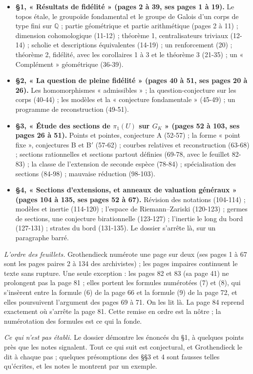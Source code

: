 \documentclass[11pt,a4paper]{article}
\begin{document}
\begin{itemize}
\item \textbf{§1, « Résultats de fidélité » (pages 2 à 39, ses pages 1 à 19).}
Le topos étale, le groupoïde fondamental et le groupe de Galois d'un corps de
type fini sur $\mathbb{Q}$ ; partie géométrique et partie arithmétique
(pages 2 à 11) ; dimension cohomologique (11-12) ; théorème 1, centralisateurs
triviaux (12-14) ; scholie et descriptions équivalentes (14-19) ; un
renforcement (20) ; théorème 2, fidélité, avec les corollaires 1 à 3 et le
théorème 3 (21-35) ; un « Complément » géométrique (36-39).
\item \textbf{§2, « La question de pleine fidélité » (pages 40 à 51, ses pages
20 à 26).} Les homomorphismes « admissibles » ; la question-conjecture sur les
corps (40-44) ; les modèles et la « conjecture fondamentale » (45-49) ; un
programme de reconstruction (49-51).
\item \textbf{§3, « Étude des sections de $\pi_1(U)$ sur $G_K$ » (pages 52 à
103, ses pages 26 à 51).} Points et pointes, conjecture A (52-57) ; la forme
« point fixe », conjectures B et B$'$ (57-62) ; courbes relatives et
reconstruction (63-68) ; sections rationnelles et sections partout définies
(69-78, avec le feuillet 82-83) ; la classe de l'extension de seconde espèce
(78-84) ; spécialisation des sections (84-98) ; mauvaise réduction (98-103).
\item \textbf{§4, « Sections d'extensions, et anneaux de valuation généraux »
(pages 104 à 135, ses pages 52 à 67).} Révision des notations (104-114) ;
modèles et inertie (114-120) ; l'espace de Riemann–Zariski (120-123) ; germes
de sections, une conjecture birationnelle (123-127) ; l'inertie le long du bord
(127-131) ; strates du bord (131-135). Le dossier s'arrête là, sur un
paragraphe barré.
\end{itemize}

\emph{L'ordre des feuillets.} Grothendieck numérote une page sur deux (ses
pages 1 à 67 sont les pages paires 2 à 134 des archivistes) ; les pages
impaires continuent le texte sans rupture. Une seule exception : les pages 82
et 83 (sa page 41) ne prolongent pas la page 81 ; elles portent les formules
numérotées (7) et (8), qui s'insèrent entre la formule (6) de la page 66 et la
formule (9) de la page 72, et elles poursuivent l'argument des pages 69 à 71.
On les lit là. La page 84 reprend exactement où s'arrête la page 81. Cette
remise en ordre est la nôtre ; la numérotation des formules est ce qui la
fonde.

\emph{Ce qui n'est pas établi.} Le dossier démontre les énoncés du §1, à
quelques points près que les notes signalent. Tout ce qui suit est
conjectural, et Grothendieck le dit à chaque pas ; quelques présomptions des
§§3 et 4 sont fausses telles qu'écrites, et les notes le montrent par un
exemple.
\end{document}
